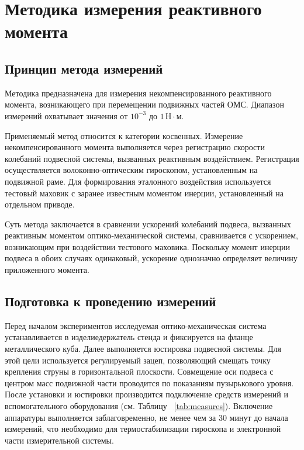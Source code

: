 \section{Методика измерения реактивного момента}

\subsection{Принцип метода измерений}

Методика предназначена для измерения некомпенсированного реактивного момента, возникающего при перемещении подвижных частей ОМС. Диапазон измерений охватывает значения от $10^{-3}$ до $1 \,\text{Н}\cdot\text{м}$.

Применяемый метод относится к категории косвенных. Измерение некомпенсированного момента выполняется через регистрацию скорости колебаний подвесной системы, вызванных реактивным воздействием. Регистрация осуществляется волоконно-оптическим гироскопом, установленным на подвижной раме. Для формирования эталонного воздействия используется тестовый маховик с заранее известным моментом инерции, установленный на отдельном приводе.

Суть метода заключается в сравнении ускорений колебаний подвеса, вызванных реактивным моментом оптико-механической системы, сравнивается с ускорением, возникающим при воздействии тестового маховика. Поскольку момент инерции подвеса в обоих случаях одинаковый, ускорение однозначно определяет величину приложенного момента. 



\subsection{Подготовка к проведению измерений}

Перед началом экспериментов исследуемая оптико-механическая система устанавливается в изделиедержатель стенда и фиксируется на фланце металлического куба. Далее выполняется юстировка подвесной системы. Для этой цели используется регулируемый зацеп, позволяющий смещать точку крепления струны в горизонтальной плоскости. Совмещение оси подвеса с центром масс подвижной части проводится по показаниям пузырькового уровня. После установки и юстировки производится подключение средств измерений и вспомогательного оборудования (см. Таблицу ~\cref{tab:measures}). Включение аппаратуры выполняется заблаговременно, не менее чем за 30 минут до начала измерений, что необходимо для термостабилизации гироскопа и электронной части измерительной системы.

